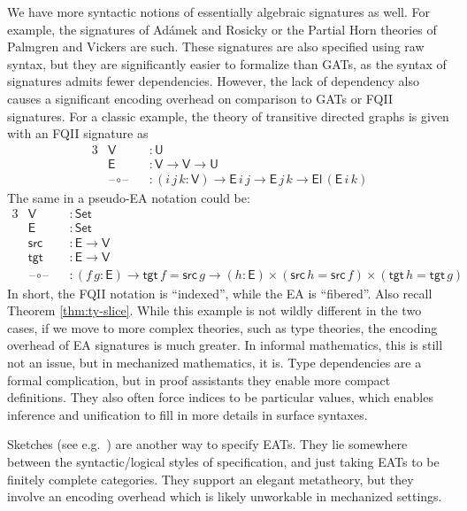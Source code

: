 \documentclass[12pt,a4paper,twoside,openany]{book}
\theoremstyle{remark}
\theoremstyle{definition}
\theoremstyle{theorem}
\newcommand{\ms}[1]{\mathsf{#1}}
\newcommand{\U}{\mathsf{U}}
\newcommand{\El}{\mathsf{El}}
\newcommand{\blank}{\mathord{\hspace{1pt}\text{--}\hspace{1pt}}}
\newcommand{\Set}{\mathsf{Set}}
\begin{document}
We have more syntactic notions of essentially algebraic signatures as well. For
example, the signatures of Adámek and Rosicky
\cite[Section~3.D]{adamek1994locally} or the Partial Horn theories of Palmgren
and Vickers \cite{partialhorn} are such. These signatures are also specified
using raw syntax, but they are significantly easier to formalize than GATs, as
the syntax of signatures admits fewer dependencies. However, the lack of
dependency also causes a significant encoding overhead on comparison to GATs or
FQII signatures. For a classic example, the theory of transitive directed graphs
is given with an FQII signature as
\begin{alignat*}{3}
  & \ms{V} &&: \U\\
  & \ms{E} &&: \ms{V} \to \ms{V} \to \U\\
  & \blank\circ\blank &&: (i\,j\,k : \ms{V}) \to \ms{E}\,i\,j \to \ms{E}\,j\,k \to \El\,(\ms{E}\,i\,k)
\end{alignat*}
The same in a pseudo-EA notation could be:
\begingroup
\allowdisplaybreaks
\begin{alignat*}{3}
  & \ms{V}            &&: \Set\\
  & \ms{E}            &&: \Set\\
  & \ms{src}          &&: \ms{E} \to \ms{V}\\
  & \ms{tgt}          &&: \ms{E} \to \ms{V}\\
  & \blank\circ\blank &&: (f\,g : \ms{E}) \to \ms{tgt}\,f = \ms{src}\,g \to (h : \ms{E}) \times (\ms{src}\,h = \ms{src}\,f) \times (\ms{tgt}\,h = \ms{tgt}\,g)
\end{alignat*}
\endgroup
In short, the FQII notation is ``indexed'', while the EA is ``fibered''. Also
recall Theorem \ref{thm:ty-slice}. While this example is not wildly different in
the two cases, if we move to more complex theories, such as type theories, the
encoding overhead of EA signatures is much greater. In informal mathematics,
this is still not an issue, but in mechanized mathematics, it is. Type
dependencies are a formal complication, but in proof assistants they enable more
compact definitions. They also often force indices to be particular values, which
enables inference and unification to fill in more details in surface syntaxes.

Sketches (see e.g.\ \cite[Section~4]{barr1985toposes}) are another way to
specify EATs. They lie somewhere between the syntactic/logical styles of
specification, and just taking EATs to be finitely complete categories. They
support an elegant metatheory, but they involve an encoding overhead which is
likely unworkable in mechanized settings.
\end{document}
